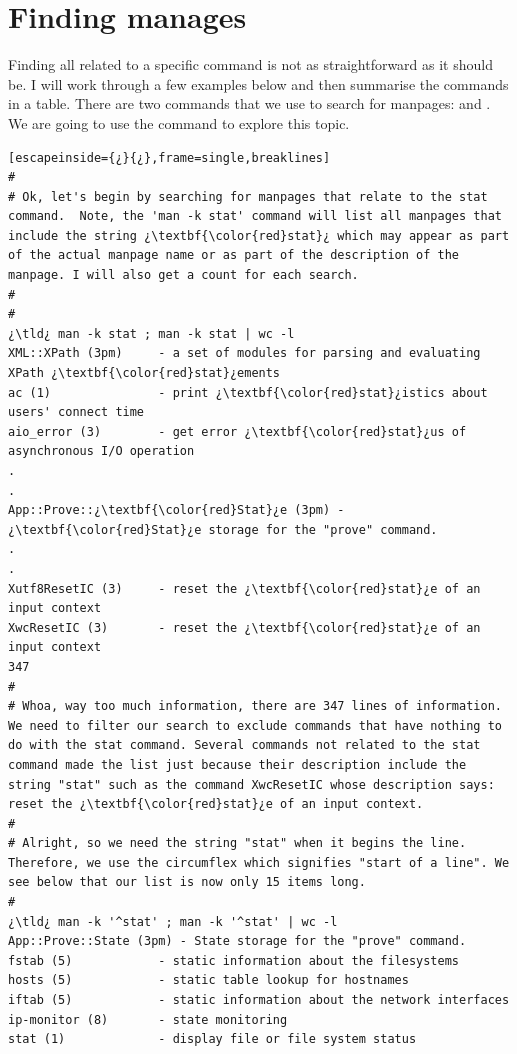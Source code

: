 \section{Finding manages}

Finding all  related to a specific command is not as straightforward as it should be. I will work through a few examples below and then summarise the commands in a table. There are two commands that we use to search for manpages:  and . We are going to use the  command to explore this topic.

\begin{lstlisting}[escapeinside={¿}{¿},frame=single,breaklines]
#
# Ok, let's begin by searching for manpages that relate to the stat command.  Note, the 'man -k stat' command will list all manpages that include the string ¿\textbf{\color{red}stat}¿ which may appear as part of the actual manpage name or as part of the description of the manpage. I will also get a count for each search.
#
#
¿\tld¿ man -k stat ; man -k stat | wc -l
XML::XPath (3pm)     - a set of modules for parsing and evaluating XPath ¿\textbf{\color{red}stat}¿ements
ac (1)               - print ¿\textbf{\color{red}stat}¿istics about users' connect time
aio_error (3)        - get error ¿\textbf{\color{red}stat}¿us of asynchronous I/O operation
.
.
App::Prove::¿\textbf{\color{red}Stat}¿e (3pm) - ¿\textbf{\color{red}Stat}¿e storage for the "prove" command.
.
.
Xutf8ResetIC (3)     - reset the ¿\textbf{\color{red}stat}¿e of an input context
XwcResetIC (3)       - reset the ¿\textbf{\color{red}stat}¿e of an input context
347
#
# Whoa, way too much information, there are 347 lines of information. We need to filter our search to exclude commands that have nothing to do with the stat command. Several commands not related to the stat command made the list just because their description include the string "stat" such as the command XwcResetIC whose description says: reset the ¿\textbf{\color{red}stat}¿e of an input context.
#
# Alright, so we need the string "stat" when it begins the line. Therefore, we use the circumflex which signifies "start of a line". We see below that our list is now only 15 items long.
#
¿\tld¿ man -k '^stat' ; man -k '^stat' | wc -l
App::Prove::State (3pm) - State storage for the "prove" command.
fstab (5)            - static information about the filesystems
hosts (5)            - static table lookup for hostnames
iftab (5)            - static information about the network interfaces
ip-monitor (8)       - state monitoring
stat (1)             - display file or file system status

\end{lstlisting}
